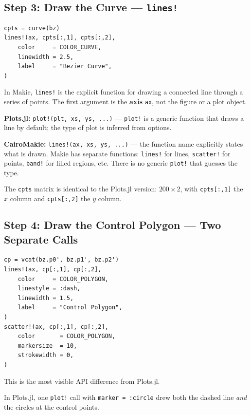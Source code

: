 \documentclass[12pt, a4paper]{article}
\newcommand{\cd}[1]{\texttt{#1}}
\begin{document}
\subsection{Step 3: Draw the Curve --- \texttt{lines!}}

\begin{verbatim}
cpts = curve(bz)
lines!(ax, cpts[:,1], cpts[:,2],
    color     = COLOR_CURVE,
    linewidth = 2.5,
    label     = "Bezier Curve",
)
\end{verbatim}

In Makie, \cd{lines!} is the explicit function for drawing
a connected line through a series of points.
The first argument is the \textbf{axis} \cd{ax}, not the
figure or a plot object.

\begin{diffbox}
\textbf{Plots.jl:} \cd{plot!(plt, xs, ys, ...)}
--- \cd{plot!} is a generic function that draws a line
by default; the type of plot is inferred from options.

\textbf{CairoMakie:} \cd{lines!(ax, xs, ys, ...)}
--- the function name explicitly states what is drawn.
Makie has separate functions: \cd{lines!} for lines,
\cd{scatter!} for points, \cd{band!} for filled regions, etc.
There is no generic \cd{plot!} that guesses the type.
\end{diffbox}

The \cd{cpts} matrix is identical to the Plots.jl version:
$200 \times 2$, with \cd{cpts[:,1]} the $x$ column and
\cd{cpts[:,2]} the $y$ column.

\subsection{Step 4: Draw the Control Polygon --- Two Separate Calls}

\begin{verbatim}
cp = vcat(bz.p0', bz.p1', bz.p2')
lines!(ax, cp[:,1], cp[:,2],
    color     = COLOR_POLYGON,
    linestyle = :dash,
    linewidth = 1.5,
    label     = "Control Polygon",
)
scatter!(ax, cp[:,1], cp[:,2],
    color       = COLOR_POLYGON,
    markersize  = 10,
    strokewidth = 0,
)
\end{verbatim}

This is the most visible API difference from Plots.jl.

In Plots.jl, one \cd{plot!} call with \cd{marker = :circle}
drew both the dashed line \emph{and} the circles at the
control points.
\end{document}
